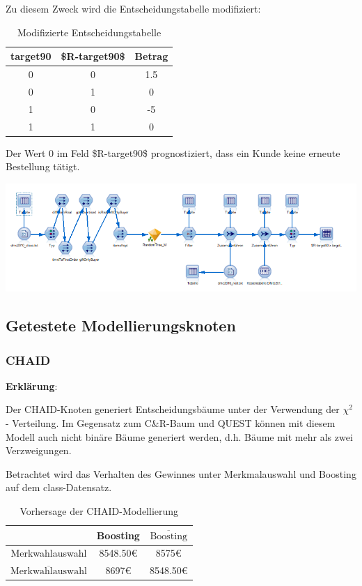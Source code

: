 \documentclass[a4paper,12pt]{article}
\begin{document}
Zu diesem Zweck wird die Entscheidungstabelle modifiziert:
\begin{table}[h]
\begin{center}
\begin{tabular}{c | c | c}
target90 & \$R-target90\$ & Betrag
\\
\hline
0 & 0 & 1.5
\\
\hline
0 & 1 & 0
\\
\hline
1 & 0 & -5
\\
\hline
1 & 1  & 0
\end{tabular}
\caption{Modifizierte Entscheidungstabelle}
\end{center}
\end{table}
Der Wert 0 im Feld \$R-target90\$ prognostiziert, dass ein Kunde keine erneute Bestellung tätigt.
\begin{center}
\includegraphics[width=\textwidth]{Screens/test_bewertung}
\end{center}
\subsection{Getestete Modellierungsknoten}
\subsubsection{CHAID}
{\bf Erklärung}:
\par
\vspace{0.2cm}
Der CHAID-Knoten generiert Entscheidungsbäume unter der Verwendung der $\chi^2$  - Verteilung.
Im Gegensatz zum C\&R-Baum  und QUEST können mit diesem Modell auch nicht binäre Bäume generiert werden, d.h. Bäume mit mehr als zwei
Verzweigungen. 
\par
\vspace{0.2cm}
Betrachtet wird das Verhalten des Gewinnes unter Merkmalauswahl und Boosting auf dem class-Datensatz. 

\begin{table}[h]
\begin{center}
\begin{tabular}{ c | c | c }
 & Boosting & $\overline{\text{Boosting}}$
\\
\hline
Merkwahlauswahl  &  8548.50\;\euro & 8575\;\euro
\\
$\overline{\text{Merkwahlauswahl}}$ & 8697\;\euro  &  8548.50\;\euro
\\
\end{tabular}
\caption{Vorhersage der CHAID-Modellierung}
\end{center}
\end{table}
\end{document}
